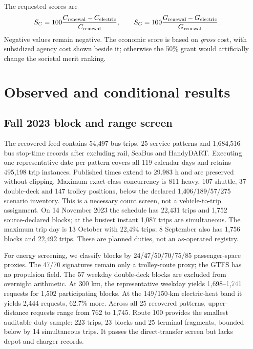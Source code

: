 \documentclass[12pt,letterpaper]{article}
\begin{document}
The requested scores are
\begin{equation}
 S_C=100\frac{C_{\rm renewal}-C_{\rm electric}}{C_{\rm renewal}},\qquad
 S_G=100\frac{G_{\rm renewal}-G_{\rm electric}}{G_{\rm renewal}}.
\end{equation}
Negative values remain negative. The economic score is based on \emph{gross} cost, with subsidized agency cost shown beside it; otherwise the 50\% grant would artificially change the societal merit ranking.

\section{Observed and conditional results}
\subsection{Fall 2023 block and range screen}
The recovered feed contains 54,497 bus trips, 25 service patterns and 1,684,516 bus stop-time records after excluding rail, SeaBus and HandyDART. Executing one representative date per pattern covers all 119 calendar days and retains 495,198 trip instances. Published times extend to 29.983 h and are preserved without clipping. Maximum exact-class concurrency is 811 heavy, 107 shuttle, 37 double-deck and 147 trolley positions, below the declared 1,406/189/57/275 scenario inventory. This is a necessary count screen, not a vehicle-to-trip assignment. On 14 November 2023 the schedule has 22,431 trips and 1,752 source-declared blocks; at the busiest instant 1,087 trips are simultaneous. The maximum trip day is 13 October with 22,494 trips; 8 September also has 1,756 blocks and 22,492 trips. These are planned duties, not an as-operated registry.\cite{gtfs2023}

For energy screening, we classify blocks by 24/47/50/70/75/85 passenger-space proxies. The 47/70 signatures remain only a trolley-route proxy; the GTFS has no propulsion field. The 57 weekday double-deck blocks are excluded from overnight arithmetic. At 300 km, the representative weekday yields 1,698--1,741 requests for 1,502 participating blocks. At the 149/150-km electric-heat band it yields 2,444 requests, 62.7\% more. Across all 25 recovered patterns, upper-distance requests range from 762 to 1,745. Route 100 provides the smallest auditable duty sample: 223 trips, 23 blocks and 25 terminal fragments, bounded below by 14 simultaneous trips. It passes the direct-transfer screen but lacks depot and charger records.
\end{document}
